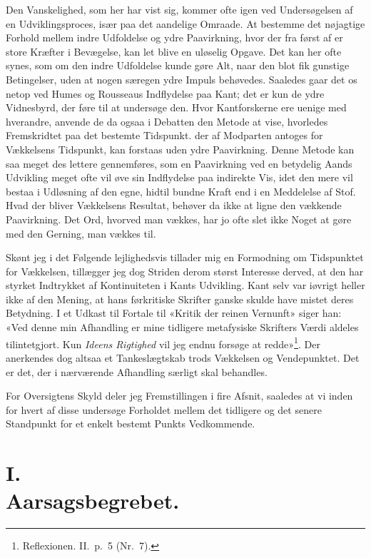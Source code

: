 \documentclass[12pt,a4paper]{article}
\newcommand{\apage}[1]{\marginnote{\footnotesize\textit{[#1]}}}
\begin{document}
Den Vanskelighed, som her har vist sig, kommer ofte igen ved
Undersøgelsen af en Udviklingsproces, især paa det aandelige Omraade. At
bestemme det nøjagtige Forhold mellem indre Udfoldelse og ydre
Paavirkning, hvor der fra først af er store Kræfter i Bevægelse, kan let
blive en uløselig Opgave. Det kan her ofte synes, som om den indre
Udfoldelse kunde gøre Alt, naar den blot fik gunstige Betingelser, uden
at nogen særegen ydre Impuls behøvedes. Saaledes gaar det os netop ved
Humes og Rousseaus Indflydelse paa Kant; det er kun de ydre Vidnesbyrd,
der føre til at undersøge den. Hvor Kantforskerne ere uenige med
hverandre, anvende de da ogsaa i Debatten den Metode at vise, hvorledes
Fremskridtet paa det bestemte Tidspunkt. der af Modparten antoges for
Vækkelsens Tidspunkt, kan forstaas uden ydre Paavirkning. Denne Metode
kan saa meget des lettere gennemføres, som en Paavirkning ved en
betydelig Aands Udvikling meget ofte vil øve sin Indflydelse paa
indirekte Vis, idet den mere vil bestaa i Udløsning af den egne, hidtil
bundne Kraft end i en Meddelelse af Stof. Hvad der bliver Vækkelsens
Resultat, behøver da ikke at ligne den vækkende Paavirkning. Det Ord,
hvorved man vækkes, har jo ofte slet ikke Noget at gøre med den Gerning,
man vækkes til.

Skønt jeg i det Følgende lejlighedsvis tillader mig en Formodning om
Tidspunktet for Vækkelsen, tillægger jeg dog Striden derom størst
Interesse derved, at den har styrket Indtrykket af Kontinuiteten i Kants
Udvikling. Kant selv var iøvrigt heller ikke af den Mening, at hans
førkritiske Skrifter ganske skulde have mistet deres Betydning. I et
Udkast til Fortale til «Kritik der reinen Vernunft» siger han: «Ved denne
min Afhandling er mine tidligere metafysiske Skrifters Værdi aldeles
tilintetgjort. Kun \emph{Ideens Rigtighed} vil jeg endnu forsøge at
redde»\footnote{Reflexionen. II.\ p.\ 5 (Nr.\ 7).}. Der
anerkendes dog altsaa et Tankeslægtskab trods Vækkelsen og Vendepunktet.
Det er det, der i nærværende Afhandling særligt skal behandles.

For Oversigtens Skyld deler jeg Fremstillingen i fire Afsnit, saaledes at
vi inden \apage{9}  for hvert af disse undersøge Forholdet mellem det tidligere og
det senere Standpunkt for et enkelt bestemt Punkts Vedkommende.

\section*{I.\\ Aarsagsbegrebet.}
\end{document}
